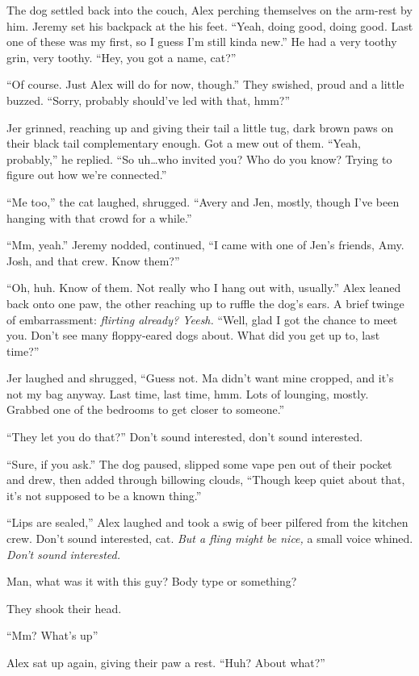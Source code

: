 The dog settled back into the couch, Alex perching themselves on the arm-rest by him. Jeremy set his backpack at the his feet. ``Yeah, doing good, doing good. Last one of these was my first, so I guess I'm still kinda new.'' He had a very toothy grin, very toothy. ``Hey, you got a name, cat?''

``Of course. Just Alex will do for now, though.'' They swished, proud and a little buzzed. ``Sorry, probably should've led with that, hmm?''

Jer grinned, reaching up and giving their tail a little tug, dark brown paws on their black tail complementary enough. Got a mew out of them. ``Yeah, probably,'' he replied. ``So uh\ldots{}who invited you? Who do you know? Trying to figure out how we're connected.''

``Me too,'' the cat laughed, shrugged. ``Avery and Jen, mostly, though I've been hanging with that crowd for a while.''

``Mm, yeah.'' Jeremy nodded, continued, ``I came with one of Jen's friends, Amy. Josh, and that crew. Know them?''

``Oh, huh. Know of them. Not really who I hang out with, usually.'' Alex leaned back onto one paw, the other reaching up to ruffle the dog's ears. A brief twinge of embarrassment: \emph{flirting already? Yeesh.} ``Well, glad I got the chance to meet you. Don't see many floppy-eared dogs about. What did you get up to, last time?''

Jer laughed and shrugged, ``Guess not. Ma didn't want mine cropped, and it's not my bag anyway. Last time, last time, hmm. Lots of lounging, mostly. Grabbed one of the bedrooms to get closer to someone.''

``They let you do that?'' Don't sound interested, don't sound interested.

``Sure, if you ask.'' The dog paused, slipped some vape pen out of their pocket and drew, then added through billowing clouds, ``Though keep quiet about that, it's not supposed to be a known thing.''

``Lips are sealed,'' Alex laughed and took a swig of beer pilfered from the kitchen crew. Don't sound interested, cat. \emph{But a fling might be nice,} a small voice whined. \emph{Don't sound interested.}

Man, what was it with this guy? Body type or something?

They shook their head.

``Mm? What's up''

Alex sat up again, giving their paw a rest. ``Huh? About what?''


